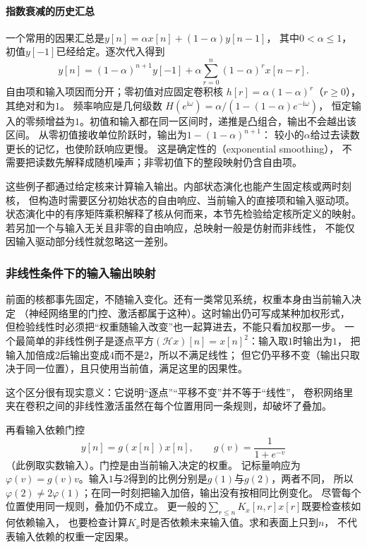 \paragraph{指数衰减的历史汇总}
一个常用的因果汇总是$y[n]=\alpha x[n]+(1-\alpha)y[n-1]$，
其中$0<\alpha\leq1$，初值$y[-1]$已经给定。逐次代入得到
\[
 y[n]=(1-\alpha)^{n+1}y[-1]
 +\alpha\sum_{r=0}^n(1-\alpha)^r x[n-r].
\]
自由项和输入项因而分开；零初值对应固定卷积核
$h[r]=\alpha(1-\alpha)^r$（$r\geq0$），其绝对和为$1$。
频率响应是几何级数
$H(e^{\mathrm i\omega})=\alpha/(1-(1-\alpha)e^{-\mathrm i\omega})$，
恒定输入的零频增益为$1$。初值和输入都在同一区间时，递推是凸组合，输出不会越出该区间。
从零初值接收单位阶跃时，输出为$1-(1-\alpha)^{n+1}$：
较小的$\alpha$给过去读数更长的记忆，也使阶跃响应更慢。
这是确定性的（exponential smoothing），
不需要把读数先解释成随机噪声；非零初值下的整段映射仍含自由项。

这些例子都通过给定核来计算输入输出。内部状态演化也能产生固定核或两时刻核，
但构造时需要区分初始状态的自由响应、当前输入的直接项和输入驱动项。
状态演化中的有序矩阵乘积解释了核从何而来，本节先检验给定核所定义的映射。
若另加一个与输入无关且非零的自由响应，总映射一般是仿射而非线性，
不能仅因输入驱动部分线性就忽略这一差别。

\subsubsection{非线性条件下的输入输出映射}

前面的核都事先固定，不随输入变化。还有一类常见系统，权重本身由当前输入决定
（神经网络里的门控、激活都属于这种）。这时输出仍可写成某种加权形式，
但检验线性时必须把“权重随输入改变”也一起算进去，不能只看加权那一步。
一个最简单的非线性例子是逐点平方$(\mathcal Hx)[n]=x[n]^2$：输入取$1$时输出为$1$，
把输入加倍成$2$后输出变成$4$而不是$2$，所以不满足线性；
但它仍平移不变（输出只取决于同一位置），且只使用当前值，满足这里的因果性。

这个区分很有现实意义：它说明“逐点”“平移不变”并不等于“线性”，
卷积网络里夹在卷积之间的非线性激活虽然在每个位置用同一条规则，却破坏了叠加。

再看输入依赖门控
\[
  y[n]=g(x[n])x[n],\qquad g(v)=\frac1{1+e^{-v}}
\]
（此例取实数输入）。门控是由当前输入决定的权重。
记标量响应为$\varphi(v)=g(v)v$。输入$1$与$2$得到的比例分别是$g(1)$与$g(2)$，两者不同，
所以$\varphi(2)\neq2\varphi(1)$；在同一时刻把输入加倍，输出没有按相同比例变化。
尽管每个位置使用同一规则，叠加仍不成立。
更一般的$\sum_{r\leq n}K_x[n,r]x[r]$既要检查核如何依赖输入，
也要检查计算$K_x$时是否依赖未来输入值。求和表面上只到$n$，
不代表输入依赖的权重一定因果。

